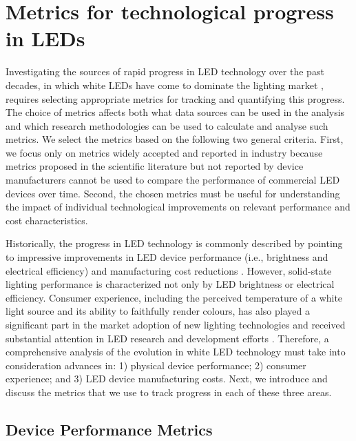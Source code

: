 \documentclass[twoside,twocolumn,9pt]{article}
\begin{document}
\section{Metrics for technological progress in LEDs}

Investigating the sources of rapid progress in LED technology over the past decades, in which white LEDs have come to dominate the lighting market \cite{zissis2021}, requires selecting appropriate metrics for tracking and quantifying this progress. The choice of metrics affects both what data sources can be used in the analysis and which research methodologies can be used to calculate and analyse such metrics. We select the metrics based on the following two general criteria. First, we focus only on metrics widely accepted and reported in industry because metrics proposed in the scientific literature but not reported by device manufacturers cannot be used to compare the performance of commercial LED devices over time. Second, the chosen metrics must be useful for understanding the impact of individual technological improvements on relevant performance and cost characteristics.

Historically, the progress in LED technology is commonly described by pointing to impressive improvements in LED device performance (i.e., brightness and electrical efficiency) and manufacturing cost reductions \cite{Taki2019}. However, solid-state lighting performance is characterized not only by LED brightness or electrical efficiency. Consumer experience, including the perceived temperature of a white light source and its ability to faithfully render colours, has also played a significant part in the market adoption of new lighting technologies \cite{Menanteau2000}\cite{Sandahl2006}\cite{CAIRD2008}\cite{murphy2012governing} and received substantial attention in LED research and development efforts \cite{azevedo2009transition}\cite{cho2017white}. Therefore, a comprehensive analysis of the evolution in white LED technology must take into consideration advances in: 1) physical device performance; 2) consumer experience; and 3) LED device manufacturing costs. Next, we introduce and discuss the metrics that we use to track progress in each of these three areas. 

\subsection{Device Performance Metrics}
\label{sec:device_performance_metrics}
\end{document}
